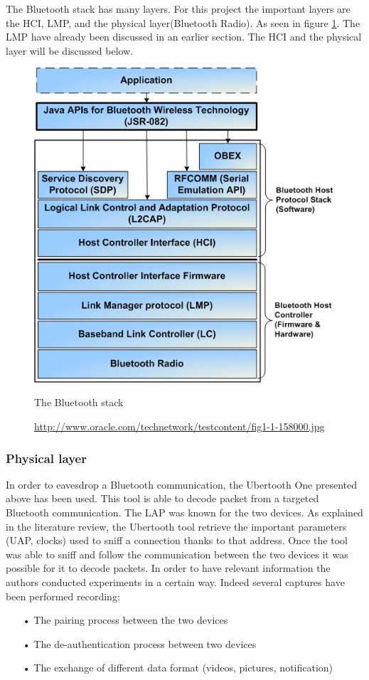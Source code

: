 
The Bluetooth stack has many layers. For this project the important layers are the HCI, LMP, and the physical layer(Bluetooth Radio). As seen in figure \ref{fig:bt_stack}. The LMP have already been discussed in an earlier section. The HCI and the physical layer will be discussed below.

\begin{figure}[h]
  \includegraphics[scale=0.8]{images/bluetoothstack.jpg}
  \caption{The Bluetooth stack}
  \label{fig:bt_stack}
  \caption*{\url{http://www.oracle.com/technetwork/testcontent/fig1-1-158000.jpg}}
\end{figure}
\newpage
\subsubsection{Physical layer}
	In order to eavesdrop a Bluetooth communication, the Ubertooth One presented above has been used. This tool is able to decode packet from a targeted Bluetooth communication. \pend
	The LAP was known for the two devices. As explained in the literature review, the Ubertooth tool retrieve the important parameters (UAP, clocks) used to sniff a connection thanks to that address. Once the tool was able to sniff and follow the
	 communication between the two devices it was possible for it to decode packets.
	In order to have relevant information the authors conducted experiments in a certain way. Indeed several captures have been performed recording:
\begin{itemize}
	\item[•] The pairing process between the two devices
	\item[•] The de-authentication process between two devices
	\item[•] The exchange of different data format (videos, pictures, notification) 
\end{itemize}
		 
